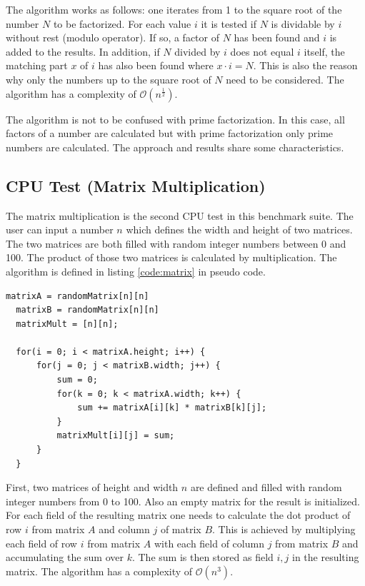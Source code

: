 The algorithm works as follows: one iterates from 1 to the square root of the number $N$ to be factorized. For each value $i$ it is tested if $N$ is dividable by $i$ without rest (modulo operator). If so, a factor of $N$ has been found and $i$ is added to the results. In addition, if $N$ divided by $i$ does not equal $i$ itself, the matching part $x$ of $i$ has also been found where $x \cdot i = N$. This is also the reason why only the numbers up to the square root of $N$ need to be considered. The algorithm has a complexity of $\mathcal{O}(n^{\frac{1}{2}})$.

\begin{remark}
The algorithm is not to be confused with prime factorization. In this case, all factors of a number are calculated but with prime factorization only prime numbers are calculated. The approach and results share some characteristics.
\end{remark}

\newpage
\subsection{CPU Test (Matrix Multiplication)}
The matrix multiplication is the second \gls{CPU} test in this benchmark suite. The user can input a number $n$ which defines the width and height of two matrices. The two matrices are both filled with random integer numbers between 0 and 100. The product of those two matrices is calculated by multiplication. The algorithm is defined in listing \ref{code:matrix} in pseudo code.

\begin{minipage}{\linewidth}
\begin{lstlisting}[frame=single,caption={Matrix multiplication test pseudo code},label=code:matrix,linewidth=0.8\textwidth,xleftmargin=.2\textwidth]
  matrixA = randomMatrix[n][n]
  matrixB = randomMatrix[n][n]
  matrixMult = [n][n];
  
  for(i = 0; i < matrixA.height; i++) {
      for(j = 0; j < matrixB.width; j++) {
          sum = 0;
          for(k = 0; k < matrixA.width; k++) {
              sum += matrixA[i][k] * matrixB[k][j];
          }
          matrixMult[i][j] = sum;
      }
  }
\end{lstlisting}
\end{minipage}
\newline

First, two matrices of height and width $n$ are defined and filled with random integer numbers from 0 to 100. Also an empty matrix for the result is initialized. For each field of the resulting matrix one needs to calculate the dot product of row $i$ from matrix $A$ and column $j$ of matrix $B$. This is achieved by multiplying each field of row $i$ from matrix $A$ with each field of column $j$ from matrix $B$ and accumulating the sum over $k$. The sum is then stored as field $i,j$ in the resulting matrix. The algorithm has a complexity of $\mathcal{O}(n^{3})$.
